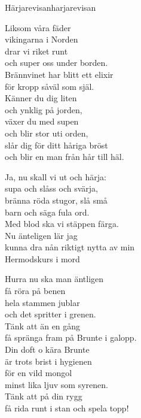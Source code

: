 \begin{song}{Härjarevisan}{harjarevisan}
\begin{vers}
Liksom våra fäder \\
vikingarna i Norden\\
drar vi riket runt\\
och super oss under borden.\\
Brännvinet har blitt ett elixir\\
för kropp såväl som själ.\\
Känner du dig liten\\
och ynklig på jorden,\\
växer du med supen\\
och blir stor uti orden,\\
slår dig för ditt håriga bröst\\
och blir en man från hår till häl.\\
\end{vers}
\begin{vers}
Ja, nu skall vi ut och härja: \\
supa och slåss och svärja,\\
bränna röda stugor, slå små\\
barn och säga fula ord.\\
Med blod ska vi stäppen färga.\\
Nu änteligen lär jag\\
kunna dra nån riktigt nytta av min\\
Hermodskurs i mord\\
\end{vers}
\newp
\begin{vers}
Hurra nu ska man äntligen \\
få röra på benen\\
hela stammen jublar\\
och det spritter i grenen.\\
Tänk att än en gång\\
få spränga fram på Brunte i galopp.\\
Din doft o kära Brunte\\
är trots brist i hygienen\\
för en vild mongol\\
minst lika ljuv som syrenen.\\
Tänk att på din rygg\\
få rida runt i stan och spela topp!\\
\end{vers}

\end{song}

